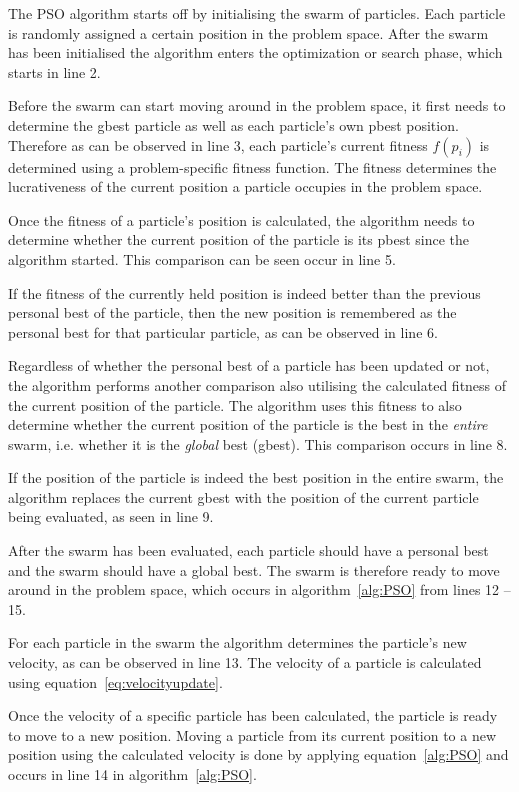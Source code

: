 The PSO algorithm starts off by initialising the swarm of particles. Each particle is randomly assigned a certain position in the problem space. After the swarm has been initialised the algorithm enters the optimization or search phase, which starts in line 2.

Before the swarm can start moving around in the problem space, it first needs to determine the gbest particle as well as each particle's own pbest position. Therefore as can be observed in line 3, each particle's current fitness $f(p_i)$ is determined using a problem-specific fitness function. The fitness determines the lucrativeness of the current position a particle occupies in the problem space.

Once the fitness of a particle's position is calculated, the algorithm needs to determine whether the current position of the particle is its pbest since the algorithm started. This comparison can be seen occur in line 5. 

If the fitness of the currently held position is indeed better than the previous personal best of the particle, then the new position is remembered as the personal best for that particular particle, as can be observed in line 6.

Regardless of whether the personal best of a particle has been updated or not, the algorithm performs another comparison also utilising the calculated fitness of the current position of the particle. The algorithm uses this fitness to also determine whether the current position of the particle is the best in the \emph{entire} swarm, i.e. whether it is  the \emph{global} best (gbest). This comparison occurs in line  8.

If the position of the particle is indeed the best position in the entire swarm, the algorithm replaces the current gbest with the position of the current particle being evaluated, as seen in line 9.

After the swarm has been evaluated, each particle should have a personal best and the swarm should have a global best. The swarm is therefore ready to move around in the problem space, which occurs in algorithm~\ref{alg:PSO} from lines 12 -- 15.

For each particle in the swarm the algorithm determines the particle's new velocity, as can be observed in line 13. The velocity of a particle is calculated using equation~\ref{eq:velocityupdate}. 

Once the velocity of a specific particle has been calculated, the particle is ready to move to a new position. Moving a particle from its current position to a new position using the calculated velocity is done by applying equation~\ref{alg:PSO} and occurs in line 14 in algorithm~\ref{alg:PSO}.


